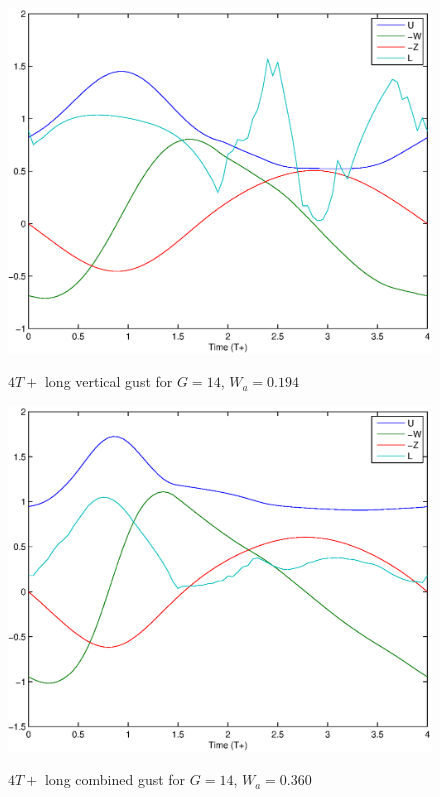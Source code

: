 \begin{figure}[ht]
	\begin{center}
		\scalebox{0.8}
		{\includegraphics{./Figures/Windtype=1_Tg=4_Wg=0p194_quad_G=13.eps}}
	\end{center}
	\caption{$4T+$ long vertical gust for $G=14$, $W_a=0.194$}
	\label{fig:vertical_optimization_UAV_modified}
\end{figure}


\begin{figure}[ht]
	\begin{center}
		\scalebox{0.8}
		{\includegraphics{./Figures/Windtype=3_Tg=4_Wg=0p360_quad_G=13.eps}}
	\end{center}
	\caption{$4T+$ long combined gust for $G=14$, $W_a=0.360$}
	\label{fig:combined_optimization_UAV_modified}
\end{figure}


